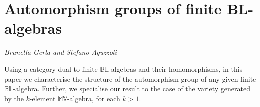 \documentclass[../booklet.tex]{subfiles}
\begin{document}
\section[Automorphism groups of finite BL-algebras. {\it Brunella Gerla and Stefano Aguzzoli}]{Automorphism groups of finite BL-algebras}
 

\begin{center}
  {\it Brunella Gerla and Stefano Aguzzoli}
\end{center}

\vskip 0.8cm


Using a category dual to finite $\mathbb{BL}$-algebras and their homomorphisms,
in this paper
we characterise the structure of the automorphism group of any given finite $\mathbb{BL}$-algebra.
Further, we specialise
our result to the case of the variety generated by the $k$-element $\mathbb{MV}$-algebra, for each $k > 1$.

\end{document}
